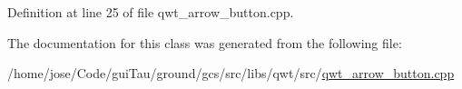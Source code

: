 Definition at line 25 of file qwt\-\_\-arrow\-\_\-button.\-cpp.



The documentation for this class was generated from the following file\-:\begin{DoxyCompactItemize}
\item 
/home/jose/\-Code/gui\-Tau/ground/gcs/src/libs/qwt/src/\hyperlink{qwt__arrow__button_8cpp}{qwt\-\_\-arrow\-\_\-button.\-cpp}\end{DoxyCompactItemize}
